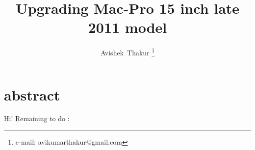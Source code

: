 \documentclass[]{article}
\begin{document}
\title{Upgrading Mac-Pro 15 inch late 2011 model}

\author{Avishek~Thakur
\thanks{e-mail: avikumarthakur@gmail.com}}

\maketitle

\section{abstract}
\label{abstract}


Hi!
Remaining to do : ~\cite{abstracttitle,blindtext1,blindtext2}


\printbibliography
\end{document}
